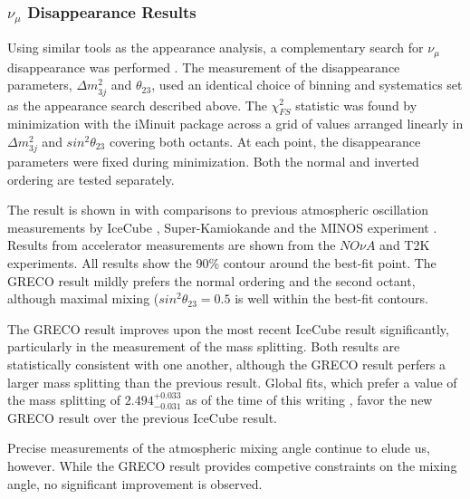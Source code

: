 \label{subsubsec:disappearance_results}
\subsubsection{$\nu_\mu$ Disappearance Results}
Using similar tools as the appearance analysis, a complementary search for ${\nu_\mu}$ disappearance was performed .
The measurement of the disappearance parameters, ${\Delta m^2_{3j}}$ and ${\theta_{23}}$, used an identical choice of binning and systematics set as the appearance search described above.
The $\chi^2_{FS}$ statistic was found by minimization with the iMinuit package  across a grid of values arranged linearly in ${\Delta m^2_{3j}}$ and ${sin^2\theta_{23}}$ covering both octants.
At each point, the disappearance parameters were fixed during minimization.
Both the normal and inverted ordering are tested separately.

The result is shown in  with comparisons to previous atmospheric oscillation measurements by IceCube , Super-Kamiokande  and the MINOS experiment .
Results from accelerator measurements are shown from the ${NO\nu A}$  and T2K  experiments.
All results show the 90\% contour around the best-fit point.
The GRECO result mildly prefers the normal ordering and the second octant, although maximal mixing (${sin^2\theta_{23}=0.5}$ is well within the best-fit contours.

The GRECO result improves upon the most recent IceCube result significantly, particularly in the measurement of the mass splitting.
Both results are statistically consistent with one another, although the GRECO result perfers a larger mass splitting than the previous result.
Global fits, which prefer a value of the mass splitting of ${2.494^{+0.033}_{-0.031}}$ as of the time of this writing , favor the new GRECO result over the previous IceCube result.

Precise measurements of the atmospheric mixing angle continue to elude us, however.
While the GRECO result provides competive constraints on the mixing angle, no significant improvement is observed.

\label{subsubsec:nmo_results}
